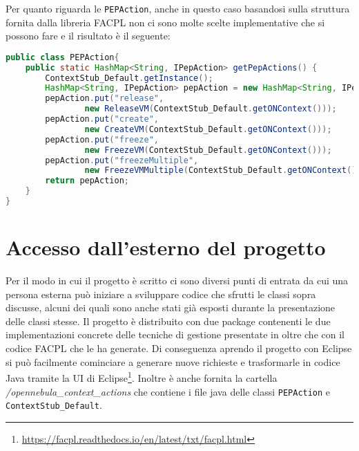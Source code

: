 Per quanto riguarda le \texttt{PEPAction}, anche in questo caso basandosi sulla struttura fornita dalla libreria FACPL non ci sono molte scelte implementative che si possono fare e il risultato è il seguente:
\begin{lstlisting}[language=Java, caption=Classe PEPAction adattata, label=code:PEPAction]
public class PEPAction{
    public static HashMap<String, IPepAction> getPepActions() {
        ContextStub_Default.getInstance();
        HashMap<String, IPepAction> pepAction = new HashMap<String, IPepAction>();
        pepAction.put("release", 
                new ReleaseVM(ContextStub_Default.getONContext()));
        pepAction.put("create", 
                new CreateVM(ContextStub_Default.getONContext()));
        pepAction.put("freeze", 
                new FreezeVM(ContextStub_Default.getONContext()));
        pepAction.put("freezeMultiple", 
				new FreezeVMMultiple(ContextStub_Default.getONContext()));
        return pepAction;
    }
}
\end{lstlisting}

\section{Accesso dall'esterno del progetto}
Per il modo in cui il progetto è scritto ci sono diversi punti di entrata da cui una persona esterna può iniziare a sviluppare codice che sfrutti le classi sopra discusse, alcuni dei quali sono anche stati già esposti durante la presentazione delle classi stesse. Il progetto è distribuito con due package contenenti le due implementazioni concrete delle tecniche di gestione presentate in \cite{10.1007/978-3-319-08260-8_6} oltre che con il codice FACPL che le ha generate. Di conseguenza aprendo il progetto con Eclipse si può facilmente cominciare a generare nuove richieste e trasformarle in codice Java tramite la UI di Eclipse\footnote{\url{https://facpl.readthedocs.io/en/latest/txt/facpl.html}}. Inoltre è anche fornita la cartella \emph{/opennebula\_context\_actions} che contiene i file java delle classi \texttt{PEPAction} e \texttt{ContextStub\_Default}.\par

